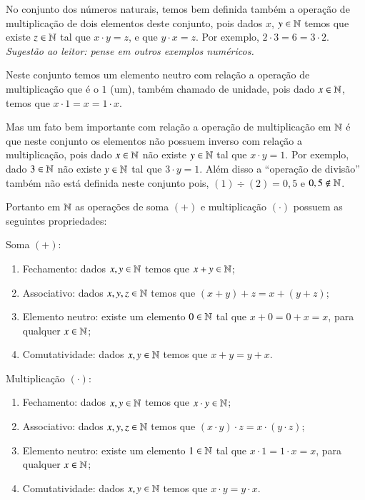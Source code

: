  No conjunto dos números naturais, temos bem definida também a operação de multiplicação de dois elementos deste conjunto, pois dados $x$, $y \in \mathbb{N}$ temos que existe $z \in \mathbb{N}$ tal que $x \cdot y=z$, e que $y \cdot x=z$. Por exemplo, $2 \cdot 3=6=3 \cdot2$. \emph{Sugestão ao leitor: pense em outros exemplos numéricos.}
 
 Neste conjunto temos um elemento neutro com relação a operação de multiplicação que é o $1$ (um), também chamado de unidade, pois dado $x \in \mathbb{N}$, temos que $x \cdot 1= x= 1 \cdot x$.

 Mas um fato bem importante com relação a operação de multiplicação em $\mathbb{N}$ é que neste conjunto os elementos não possuem inverso com relação a multiplicação, pois dado $x \in \mathbb{N}$ não existe $y \in \mathbb{N}$ tal que $x \cdot y= 1$. Por exemplo, dado $3 \in \mathbb{N}$ não existe $y \in \mathbb{N}$ tal que $3 \cdot y= 1$. Além disso a ``operação de divisão'' também não está definida neste conjunto pois, $(1)\div (2)= 0,5$ e $0,5 \notin \mathbb{N}$. 
 
  \vskip0.3cm
 
 Portanto em $\mathbb{N}$ as operações de soma $(+)$ e multiplicação $(\cdot)$ possuem as seguintes propriedades:
 
 Soma $(+)$:
 \begin{enumerate}[1)]
 \item Fechamento: dados $x, y \in \mathbb{N}$ temos que $x+y \in \mathbb{N}$;
 \item Associativo: dados $x, y, z \in \mathbb{N}$ temos que $(x+y)+z= x+(y+z)$;
 \item Elemento neutro: existe um elemento $0 \in \mathbb{N}$ tal que $x+0=0+x=x$, para qualquer $x \in \mathbb{N}$;
 \item Comutatividade: dados $x, y \in \mathbb{N}$ temos que $x+y= y+x$.
 \end{enumerate}
 
  Multiplicação $(\cdot)$:
 \begin{enumerate}[1)]
 \item Fechamento: dados $x, y \in \mathbb{N}$ temos que $x \cdot y \in \mathbb{N}$;
 \item Associativo: dados $x, y, z \in \mathbb{N}$ temos que $(x \cdot y) \cdot z= x \cdot (y \cdot z)$;
 \item Elemento neutro: existe um elemento $1 \in \mathbb{N}$ tal que $x \cdot 1= 1 \cdot x= x$, para qualquer $x \in \mathbb{N}$;
 \item Comutatividade: dados $x, y \in \mathbb{N}$ temos que $x \cdot y= y \cdot x$.
 \end{enumerate}
 
